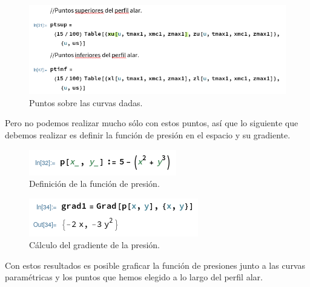 \documentclass[12pt, letterpaper]{article}
\begin{document}
\begin{figure}[H]
	\centering
	\includegraphics[width=\textwidth]{8.png}
	\caption{Puntos sobre las curvas dadas.}
\end{figure}


Pero no podemos realizar mucho sólo con estos puntos, así que lo siguiente que debemos realizar es definir la función de presión en el espacio y su gradiente.

\begin{figure}[H]
	\centering
	\includegraphics[width=\textwidth]{9.png}
	\caption{Definición de la función de presión.}
\end{figure}

\begin{figure}[H]
	\centering
	\includegraphics[width=\textwidth]{10.png}
	\caption{Cálculo del gradiente de la presión.}
\end{figure}

Con estos resultados es posible graficar la función de presiones junto a las curvas paramétricas y los puntos que hemos elegido a lo largo del perfil alar.
\end{document}
